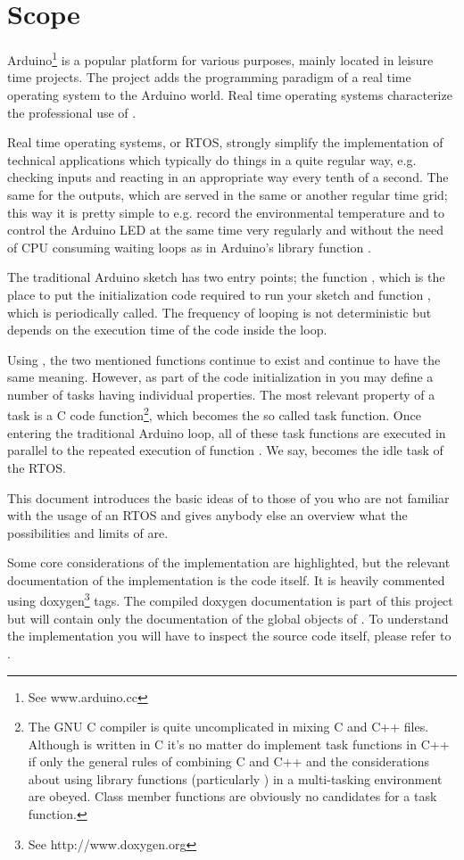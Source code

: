 \chapter{Scope}
\label{secScope}

Arduino\footnote{See www.arduino.cc} is a popular \uC{} platform for
various purposes, mainly located in leisure time projects. The \rtos{}
project adds the programming paradigm of a real time operating system to
the Arduino world. Real time operating systems characterize the
professional use of \uCs{}.

Real time operating systems, or RTOS, strongly simplify the implementation
of technical applications which typically do things in a quite regular
way, e.g. checking inputs and reacting in an appropriate way every tenth
of a second. The same for the outputs, which are served in the same or
another regular time grid; this way it is pretty simple to e.g. record the
environmental temperature and to control the Arduino LED at the same time
very regularly and without the need of CPU consuming waiting loops as
in Arduino's library function .

The traditional Arduino sketch has two entry points; the function
, which is the place to put the initialization code required
to run your sketch and function , which is periodically
called. The frequency of looping is not deterministic but depends on
the execution time of the code inside the loop.

Using \rtos{}, the two mentioned functions continue to exist and continue to
have the same meaning. However, as part of the code initialization in
 you may define a number of tasks having individual
properties. The most relevant property of a task is a C code
function\footnote{The GNU C compiler is quite uncomplicated in mixing C
and C++ files. Although \rtos{} is written in C it's no matter do implement
task functions in C++ if only the general rules of combining C and C++ and
the considerations about using library functions (particularly
) in a multi-tasking environment are obeyed. Class member
functions are obviously no candidates for a task function.}, which becomes
the so called task function. Once entering the traditional Arduino loop,
all of these task functions are executed in parallel to the repeated
execution of function . We say,  becomes the idle
task of the RTOS.

This document introduces the basic ideas of \rtos{} to those of you who are
not familiar with the usage of an RTOS and gives anybody else an overview
what the possibilities and limits of \rtos{} are.

Some core considerations of the implementation are highlighted, but the
relevant documentation of the implementation is the code itself. It is
heavily commented using doxygen\footnote{See http://www.doxygen.org} tags.
The compiled doxygen documentation is part of this project but will
contain only the documentation of the global objects of \rtos. To
understand the implementation you will have to inspect the source code
itself, please refer to .

